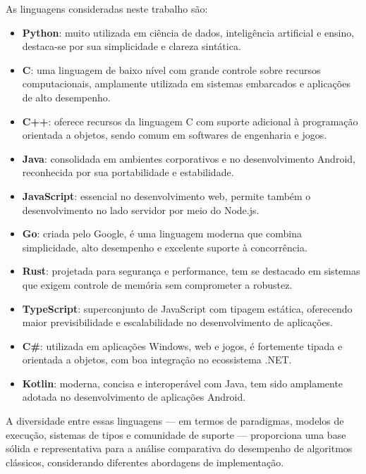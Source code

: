 \documentclass[12pt,oneside,a4paper]{report}
\begin{document}
As linguagens consideradas neste trabalho são:

\begin{itemize}
    \item \textbf{Python}: muito utilizada em ciência de dados, inteligência artificial e ensino, destaca-se por sua simplicidade e clareza sintática.
    
    \item \textbf{C}: uma linguagem de baixo nível com grande controle sobre recursos computacionais, amplamente utilizada em sistemas embarcados e aplicações de alto desempenho.
    
    \item \textbf{C++}: oferece recursos da linguagem C com suporte adicional à programação orientada a objetos, sendo comum em softwares de engenharia e jogos.
    
    \item \textbf{Java}: consolidada em ambientes corporativos e no desenvolvimento Android, reconhecida por sua portabilidade e estabilidade.
    
    \item \textbf{JavaScript}: essencial no desenvolvimento web, permite também o desenvolvimento no lado servidor por meio do Node.js.
    
    \item \textbf{Go}: criada pelo Google, é uma linguagem moderna que combina simplicidade, alto desempenho e excelente suporte à concorrência.
    
    \item \textbf{Rust}: projetada para segurança e performance, tem se destacado em sistemas que exigem controle de memória sem comprometer a robustez.
    
    \item \textbf{TypeScript}: superconjunto de JavaScript com tipagem estática, oferecendo maior previsibilidade e escalabilidade no desenvolvimento de aplicações.
    
    \item \textbf{C\#}: utilizada em aplicações Windows, web e jogos, é fortemente tipada e orientada a objetos, com boa integração no ecossistema .NET.
    
    \item \textbf{Kotlin}: moderna, concisa e interoperável com Java, tem sido amplamente adotada no desenvolvimento de aplicações Android.
\end{itemize}

A diversidade entre essas linguagens — em termos de paradigmas, modelos de execução, sistemas de tipos e comunidade de suporte — proporciona uma base sólida e representativa para a análise comparativa do desempenho de algoritmos clássicos, considerando diferentes abordagens de implementação.
\end{document}
